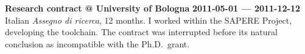 \halfblankline{}

\textbf{Research contract @ University of Bologna} \hfill \textbf{2011-05-01 --- 2011-12-12}\\
Italian \emph{Assegno di ricerca}, 12 months.
I worked within the SAPERE Project, developing the toolchain.
The contract was interrupted before its natural conclusion as incompatible with the Ph.D.\ grant.
